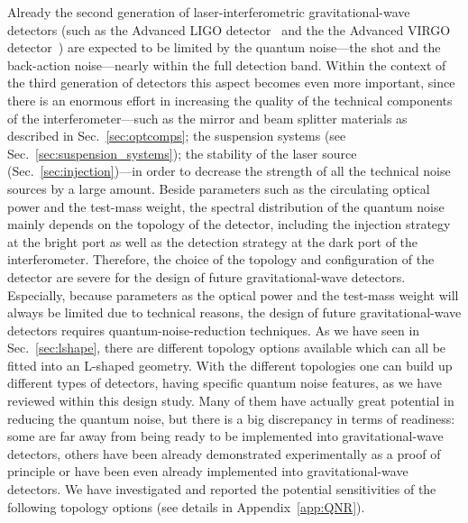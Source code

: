 Already the second generation of laser-interferometric
gravitational-wave detectors (such as the Advanced LIGO
detector~\cite{AdvancedLIGOReference2009} and the the Advanced VIRGO
detector~\cite{AdV2009}) are expected to be limited by the quantum
noise---the shot and the back-action noise---nearly within the full
detection band. Within the context of the third generation of
detectors this aspect becomes even more important, since there is
an enormous effort in increasing the quality of the technical
components of the interferometer---such as the mirror and beam
splitter materials as described in Sec.~\ref{sec:optcomps};
the suspension systems (see Sec.~\ref{sec:suspension_systems});
the stability of the laser source (Sec.~\ref{sec:injection})---in order to
decrease the strength of all the
technical noise sources by a large amount. Beside parameters such
as the circulating optical power and the test-mass weight, the
spectral distribution of the quantum noise mainly depends on the
topology of the detector, including the injection strategy at the
bright port as well as the detection strategy at the dark port of
the interferometer. Therefore, the choice of the topology and
configuration of the detector are severe for the design of future
gravitational-wave detectors. Especially, because parameters as the
optical power and the test-mass weight will always be limited due
to technical reasons, the design of future gravitational-wave
detectors requires quantum-noise-reduction techniques. As we
have seen in Sec.~\ref{sec:lshape}, there are different
topology options available which can all be fitted into an
L-shaped geometry. With the different topologies one can build up
different types of detectors, having specific quantum noise
features, as we have reviewed within this design study. Many of
them have actually great potential in reducing the quantum noise,
but there is a big discrepancy in terms of readiness: some are far
away from being ready to be implemented into gravitational-wave
detectors, others have been already demonstrated experimentally as
a proof of principle or have been even already implemented into
gravitational-wave detectors. %
We have investigated and reported the potential sensitivities of the following topology options (see details in Appendix~\ref{app:QNR}).
